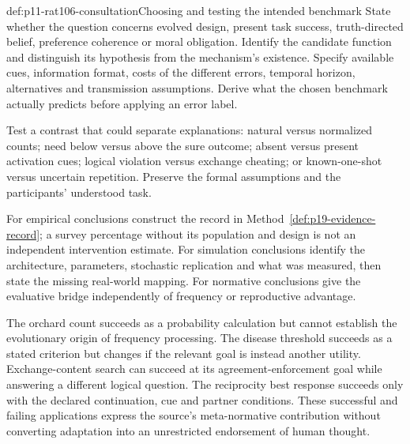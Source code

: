 \begin{hbmethod}{def:p11-rat106-consultation}{Choosing and testing the intended benchmark}
State whether the question concerns evolved design, present task
success, truth-directed belief, preference coherence or moral obligation.
Identify the candidate function and distinguish its hypothesis from
the mechanism's existence. Specify available cues, information format,
costs of the different errors, temporal horizon, alternatives and
transmission assumptions. Derive what the chosen benchmark actually
predicts before applying an error label.

Test a contrast that could separate explanations: natural versus
normalized counts; need below versus above the sure outcome; absent
versus present activation cues; logical violation versus exchange
cheating; or known-one-shot versus uncertain repetition. Preserve
the formal assumptions and the participants' understood task.

For empirical conclusions construct the record in
Method~\ref{def:p19-evidence-record}; a survey percentage without
its population and design is not an independent intervention estimate.
For simulation conclusions identify the architecture, parameters,
stochastic replication and what was measured, then state the missing
real-world mapping. For normative conclusions give the evaluative
bridge independently of frequency or reproductive advantage.
\end{hbmethod}

The orchard count succeeds as a probability calculation but cannot
establish the evolutionary origin of frequency processing. The disease
threshold succeeds as a stated criterion but changes if the relevant
goal is instead another utility. Exchange-content search can succeed at
its agreement-enforcement goal while answering a different logical
question. The reciprocity best response succeeds only with the declared
continuation, cue and partner conditions. These successful and failing
applications express the source's meta-normative contribution without
converting adaptation into an unrestricted endorsement of human thought.

